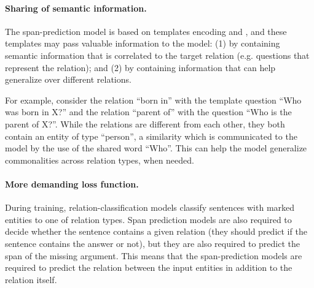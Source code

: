 \documentclass[11pt]{article}
\begin{document}
\paragraph{Sharing of semantic information.}
The span-prediction model is based on templates encoding  and , and these templates may pass valuable information to the model:
(1) by containing semantic information that is correlated to the target relation (e.g. questions that represent the relation); and
(2) by containing information that can help generalize over different relations.

For example, consider the relation ``born in'' with the template question ``Who was born in X?'' and the relation ``parent of'' with the question ``Who is the parent of X?''. While the relations are different from each other, they both contain an entity of type ``person'', a similarity which is communicated to the model by the use of the shared word ``Who''. This can help the model generalize commonalities across relation types, when needed.

\paragraph{More demanding loss function.}
During training, relation-classification models classify sentences with marked entities to one of  relation types. Span prediction models are also required to decide whether the sentence contains a given relation (they should predict if the sentence contains the answer or not), but they are also required to predict the span of the missing argument. This means that the span-prediction models are required to predict the relation between the input entities in addition to the relation itself.
\end{document}
